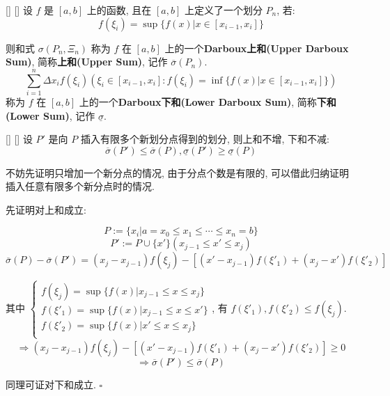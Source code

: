 \documentclass[UTF8]{ctexart}
\begin{document}
			\begin{dfn}
			    []
			    {}
			    []
			    []
				设 \(f\) 是 \([a,b]\) 上的函数, 且在 \([a,b]\) 上定义了一个划分 \(P_n\), 若: 
				\[f(\xi_i)=\sup\{f(x)|x\in[x_{i-1},x_i]\}\]
				
				则和式 \(\sigma(P_n, \Xi_n)\) 称为 \(f\) 在 \([a,b]\) 上的一个\textbf{Darboux上和(Upper Darboux Sum)}, 简称\textbf{上和(Upper Sum)}, 记作 \(\overline{\sigma}(P_n)\). 
				\[\sum_{i=1}^{n}\Delta x_if(\xi_i)(\xi_i\in[x_{i-1},x_i]: f(\xi_i)=\inf\{f(x)|x\in[x_{i-1},x_i]\})\]
				称为 \(f\) 在 \([a,b]\) 上的一个\textbf{Darboux下和(Lower Darboux Sum)}, 简称\textbf{下和(Lower Sum)}, 记作 \(\underline{\sigma}\). 
			\end{dfn}
			
            \begin{ppt}
			    []
			    {}
			    []
			    []
                设 \(P'\) 是向 \(P\) 插入有限多个新划分点得到的划分, 则上和不增, 下和不减: \[\overline{\sigma}(P')\leq\overline{\sigma}(P), \underline{\sigma}(P')\geq\underline{\sigma}(P)\]
            \end{ppt}

            \begin{prf}

                不妨先证明只增加一个新分点的情况, 由于分点个数是有限的, 可以借此归纳证明插入任意有限多个新分点时的情况. 

                先证明对上和成立: 

                \[P:=\{x_i|a=x_0\leq x_1\leq\cdots\leq x_n=b\}\]
                \[P':=P\cup\{x'\}(x_{j-1}\leq x'\leq x_j)\]
                \[\overline{\sigma}(P)-\overline{\sigma}(P')=(x_j-x_{j-1})f(\xi_j)-[(x'-x_{j-1})f(\xi'_1)+(x_j-x')f(\xi'_2)]\]
                
                其中
                \(\begin{cases}
                    f(\xi_j)=\sup\{f(x)|x_{j-1}\leq x\leq x_j\}\\
                    f(\xi'_1)=\sup\{f(x)|x_{j-1}\leq x\leq x'\}\\
                    f(\xi'_2)=\sup\{f(x)|x'\leq x\leq x_j\}\\
                \end{cases}\), 有 \(f(\xi'_1),f(\xi'_2)\leq f(\xi_j)\). 
                \[\Longrightarrow(x_j-x_{j-1})f(\xi_j)-[(x'-x_{j-1})f(\xi'_1)+(x_j-x')f(\xi'_2)]\geq 0\]
                \[\Longrightarrow\overline{\sigma}(P')\leq\overline{\sigma}(P)\]

                同理可证对下和成立. \(\square\)
            \end{prf}
            
\end{document}
